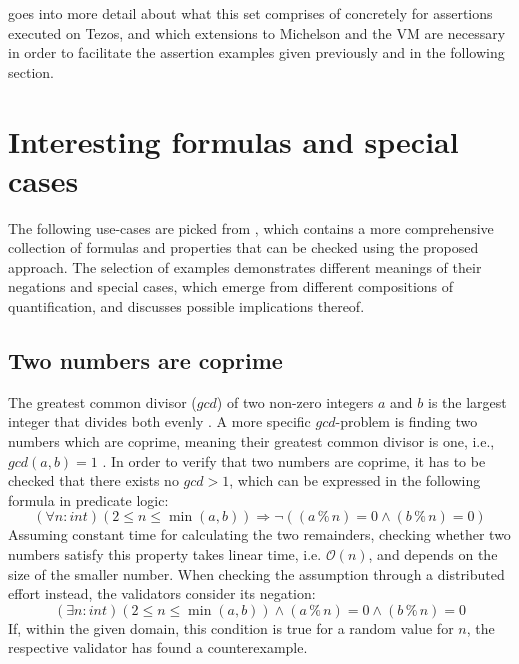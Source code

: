 \secref{} goes into more detail about what this set comprises of concretely for assertions executed on Tezos, and which extensions to Michelson and the VM are necessary in order to facilitate the assertion examples given previously and in the following section.

\section{Interesting formulas and special cases}\label{sec:examples}
The following use-cases are picked from \cite{bernhardt_veigel_2020}, which contains a more comprehensive collection of formulas and properties that can be checked using the proposed approach. The selection of examples demonstrates different meanings of their negations and special cases, which emerge from different compositions of quantification, and discusses possible implications thereof.

\subsection{Two numbers are coprime}\label{sec:coprime}
The greatest common divisor ($gcd$) of two non-zero integers $a$ and $b$ is the largest integer that divides both evenly \cite{hardy2008introduction}. A more specific $gcd$-problem is finding two numbers which are coprime, meaning their greatest common divisor is one, i.e., $gcd(a, b) = 1$ \cite{hardy2008introduction}. In order to verify that two numbers are coprime, it has to be checked that there exists no $gcd > 1$, which can be expressed in the following formula in predicate logic:
\begin{equation}\label{eq:coprime-universial}
    (\forall n : int) (2 \le n \le \min(a,b)) \Rightarrow \neg((a \mathbin{\%} n) = 0 \land (b \mathbin{\%} n) = 0)
\end{equation}
Assuming constant time for calculating the two remainders, checking whether two numbers satisfy this property takes linear time, i.e. $\mathcal{O}(n)$, and depends on the size of the smaller number. When checking the assumption through a distributed effort instead, the validators consider its negation:
\begin{equation}\label{eq:coprime-existential}
    (\exists n : int) (2 \le n \le \min(a,b)) \land (a \mathbin{\%} n) = 0 \land (b \mathbin{\%} n) = 0
\end{equation}
If, within the given domain, this condition is true for a random value for $n$, the respective validator has found a counterexample.

